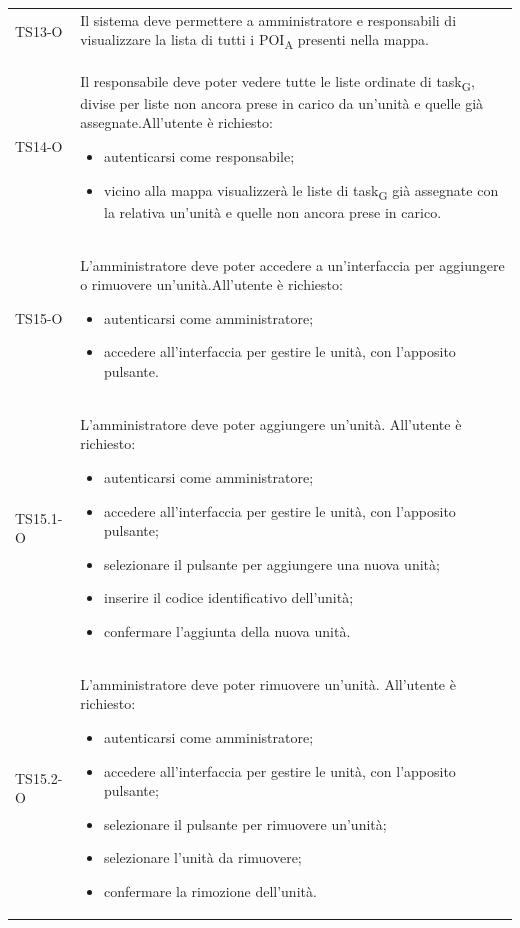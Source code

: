 \begin{longtable}{ >{\centering}p{} >{}p{}}
	TS13-O & Il sistema deve permettere a amministratore e responsabili di visualizzare la lista di tutti i POI\textsubscript{A} presenti nella mappa.\tabularnewline
	
	TS14-O & Il responsabile deve poter vedere tutte le liste ordinate di task\textsubscript{G}, divise per liste non ancora prese in carico da un'unità e quelle già assegnate.\newline All'utente è richiesto:\begin{itemize} \item autenticarsi come responsabile; \item vicino alla mappa visualizzerà le liste di task\textsubscript{G} già assegnate con la relativa un'unità e quelle non ancora prese in carico. \end{itemize}\tabularnewline
	
	TS15-O & L'amministratore deve poter accedere a un'interfaccia per aggiungere o rimuovere un'unità.\newline All'utente è richiesto: \begin{itemize} \item autenticarsi come amministratore; \item accedere all'interfaccia per gestire le unità, con l'apposito pulsante.\end{itemize}\tabularnewline
	TS15.1-O & L'amministratore deve poter aggiungere un'unità. \newline All'utente è richiesto: \begin{itemize} \item autenticarsi come amministratore; \item accedere all'interfaccia per gestire le unità, con l'apposito pulsante; \item selezionare il pulsante per aggiungere una nuova unità; \item inserire il codice identificativo dell'unità; \item confermare l'aggiunta della nuova unità.\end{itemize}\tabularnewline
	
	TS15.2-O & L'amministratore deve poter rimuovere un'unità. \newline All'utente è richiesto: \begin{itemize} \item autenticarsi come amministratore; \item accedere all'interfaccia per gestire le unità, con l'apposito pulsante; \item selezionare il pulsante per rimuovere un'unità; \item selezionare l'unità da rimuovere; \item confermare la rimozione dell'unità.\end{itemize}\tabularnewline
	

\end{longtable}
